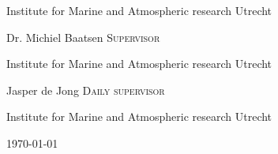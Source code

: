 \begin{titlepage}
    Institute for Marine and Atmospheric research Utrecht\par %
    \vspace{0.25cm}
    {\large Dr. Michiel Baatsen \textsc{Supervisor}\par} %
    Institute for Marine and Atmospheric research Utrecht\par %
    \vspace{0.25cm}
    {\large Jasper de Jong \textsc{Daily supervisor}\par} %
    Institute for Marine and Atmospheric research Utrecht %

	\vfill
	{\large \today\par}%
    
\end{titlepage}    

\restoregeometry %
